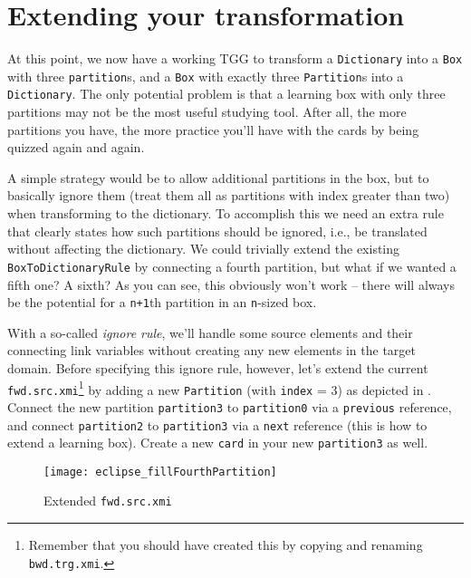 \section{Extending your transformation}
\genHeader

At this point, we now have a working TGG to transform a \texttt{Dictionary} into a \texttt{Box} with three \texttt{partition}s, and a \texttt{Box} with exactly three \texttt{Partition}s into a \texttt{Dictionary}. 
The only potential problem is that a learning box with only three partitions may not be the most useful studying tool. 
After all, the more partitions you have, the more practice you'll have with the cards by being quizzed again and again.

A simple strategy would be to allow additional partitions in the box, but to basically ignore them (treat them all as partitions with index greater than two) when transforming to the dictionary. 
To accomplish this we need an extra rule that clearly states how such partitions should be ignored, i.e., be translated without affecting the dictionary. 
We could trivially extend the existing \texttt{BoxToDictionaryRule} by connecting a fourth partition, but what if we wanted a fifth one? A sixth? As you can see, this obviously won't work -- there will always be the potential for a \texttt{n+1}th partition in an \texttt{n}-sized box. 

With a so-called \emph{ignore rule}, we'll handle some source elements and their connecting link variables without creating any new elements in the target domain.
%
Before specifying this ignore rule, however, let's extend the current \texttt{fwd.src.xmi}\footnote{Remember that you should have created this by copying and renaming \texttt{bwd.trg.xmi}.} by adding a new \texttt{Partition} (with \texttt{index} = 3) as depicted in .
Connect the new partition \texttt{partition3}  to \texttt{partition0} via a \texttt{previous} reference, and connect \texttt{partition2} to \texttt{partition3} via a \texttt{next} reference (this is how to extend a learning box).
Create a new \texttt{card} in your new \texttt{partition3} as well.

\begin{figure}[htbp]
\begin{center}
  \texttt{[image: eclipse\_fillFourthPartition]}
  \caption{Extended \texttt{fwd.src.xmi}}
  \label{fig:ea_extended_fwd_src_xmi}
\end{center}
\end{figure}


